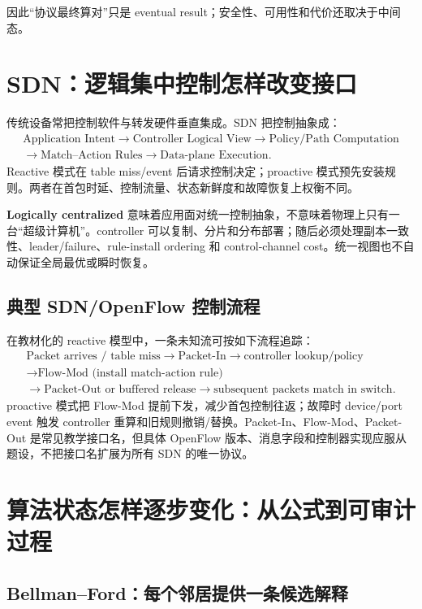 \documentclass[11pt,a4paper]{ctexart}
\newcommand{\kw}[1]{\textbf{\color{deep}#1}}
\begin{document}
因此“协议最终算对”只是 eventual result；安全性、可用性和代价还取决于中间态。

\section{SDN：逻辑集中控制怎样改变接口}

传统设备常把控制软件与转发硬件垂直集成。SDN 把控制抽象成：
\[
\begin{gathered}
\text{Application Intent}\to\text{Controller Logical View}\to\text{Policy/Path Computation}\\
\to\text{Match--Action Rules}\to\text{Data-plane Execution}.
\end{gathered}
\]
Reactive 模式在 table miss/event 后请求控制决定；proactive 模式预先安装规则。两者在首包时延、控制流量、状态新鲜度和故障恢复上权衡不同。

\kw{Logically centralized} 意味着应用面对统一控制抽象，不意味着物理上只有一台“超级计算机”。controller 可以复制、分片和分布部署；随后必须处理副本一致性、leader/failure、rule-install ordering 和 control-channel cost。统一视图也不自动保证全局最优或瞬时恢复。

\subsection{典型 SDN/OpenFlow 控制流程}

在教材化的 reactive 模型中，一条未知流可按如下流程追踪：
\[
\begin{gathered}
\text{Packet arrives / table miss}\to\text{Packet-In}\to\text{controller lookup/policy}\\
\to\text{Flow-Mod (install match-action rule)}\\
\to\text{Packet-Out or buffered release}\to\text{subsequent packets match in switch}.
\end{gathered}
\]
proactive 模式把 Flow-Mod 提前下发，减少首包控制往返；故障时 device/port event 触发 controller 重算和旧规则撤销/替换。Packet-In、Flow-Mod、Packet-Out 是常见教学接口名，但具体 OpenFlow 版本、消息字段和控制器实现应服从题设，不把接口名扩展为所有 SDN 的唯一协议。

\section{算法状态怎样逐步变化：从公式到可审计过程}

\subsection{Bellman--Ford：每个邻居提供一条候选解释}
\end{document}

